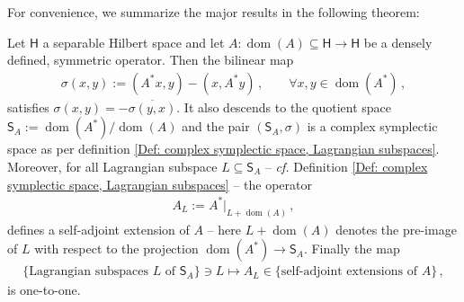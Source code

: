 \noindent For convenience, we summarize the major results in the following theorem:
\begin{theorem}\label{Thm: self-adjoint extensions with Lagrangian subspaces}
	Let $\mathsf{H}$ a separable Hilbert space and let $A\colon\operatorname{dom}(A)\subseteq\mathsf{H}\to\mathsf{H}$ be a densely defined, symmetric operator.
	Then the bilinear map
	\begin{align}\label{Eqn: symplectic form}
		\sigma(x,y):=(A^*x,y)-(x,A^*y)\,,\qquad\forall x,y\in\operatorname{dom}(A^*)\,,
	\end{align}
	satisfies $\sigma(x,y)=-\overline{\sigma(y,x)}$.
	It also descends to the quotient space $\mathsf{S}_A:=\operatorname{dom}(A^*)/\operatorname{dom}(A)$ and the pair $(\mathsf{S}_A,\sigma)$ is a complex symplectic space as per definition \ref{Def: complex symplectic space, Lagrangian subspaces}.
	Moreover, for all Lagrangian subspace $L\subseteq\mathsf{S}_A$  -- \textit{cf.} Definition \ref{Def: complex symplectic space, Lagrangian subspaces} -- the operator
	\begin{align}\label{Eqn: Lagrangian self-adjoint extension}
		A_L:=A^*|_{L+\operatorname{dom}(A)}\,,
	\end{align}
	defines a self-adjoint extension of $A$ -- here $L+\operatorname{dom}(A)$ denotes the pre-image of $L$ with respect to the projection $\operatorname{dom}(A^*)\to\mathsf{S}_A$.
	Finally the map
	\begin{align}
		\lbrace\textrm{Lagrangian subspaces $L$ of $\mathsf{S}_A$}\rbrace
		\ni L\mapsto A_L\in
		\lbrace\textrm{self-adjoint extensions of }A\rbrace\,,
	\end{align}
	is one-to-one.
\end{theorem}

